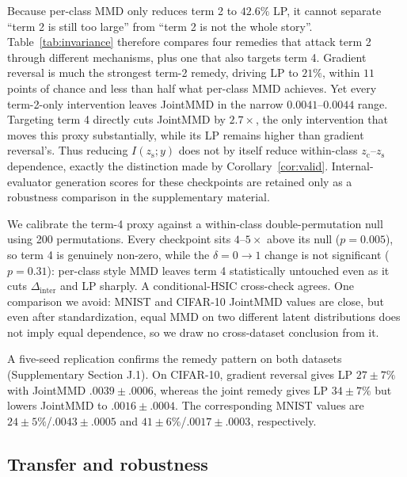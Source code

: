 \documentclass[letterpaper]{article} %
\newcommand{\zc}{z_{\mathrm{c}}}
\newcommand{\zs}{z_{\mathrm{s}}}
\newcommand{\Dinter}{\Delta_{\mathrm{inter}}}
\begin{document}
Because per-class MMD only reduces term 2 to $42.6\%$ LP, it cannot separate
``term 2 is still too large'' from ``term 2 is not the whole story''.
Table~\ref{tab:invariance} therefore compares four remedies that attack term
2 through different mechanisms, plus one that also targets term 4.
{Gradient reversal is much the strongest term-2 remedy, driving LP to
$21\%$, within $11$ points of chance and less than half what per-class MMD
achieves. Yet every term-2-only intervention leaves JointMMD in the narrow
$0.0041$--$0.0044$ range. Targeting term 4 directly cuts JointMMD by
$2.7\times$, the only intervention that moves this proxy substantially,
while its LP remains higher than gradient reversal's. Thus reducing
$I(\zs;y)$ does not by itself reduce within-class $\zc$--$\zs$ dependence,
exactly the distinction made by Corollary~\ref{cor:valid}. Internal-evaluator
generation scores for these checkpoints are retained only as a robustness
comparison in the supplementary material.}

We calibrate the term-4 proxy against a within-class double-permutation null
using 200 permutations. {Every checkpoint sits $4$--$5\times$ above its null
($p{=}0.005$), so term
4 is genuinely non-zero, while the $\delta{=}0\to1$ change is not significant
($p{=}0.31$): per-class style MMD leaves term 4 statistically untouched even
as it cuts $\Dinter$ and LP sharply. A conditional-HSIC cross-check agrees.}
One comparison we avoid: MNIST and CIFAR-10 JointMMD values are close, but
even after standardization, equal MMD on two different latent distributions
does not imply equal dependence, so we draw no cross-dataset conclusion from
it.

A five-seed replication confirms the remedy pattern on both datasets
(Supplementary Section J.1). On CIFAR-10, gradient reversal gives
LP $27\pm7\%$ with JointMMD $.0039\pm.0006$, whereas the joint remedy gives
LP $34\pm7\%$ but lowers JointMMD to $.0016\pm.0004$. The corresponding
MNIST values are $24\pm5\%$/$.0043\pm.0005$ and
$41\pm6\%$/$.0017\pm.0003$, respectively.

\subsection{Transfer and robustness}
\label{sec:exp-robust}
\end{document}
